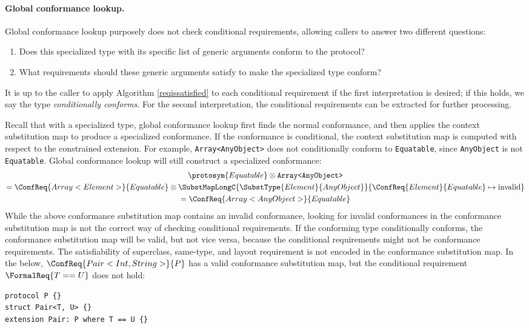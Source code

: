 \documentclass[../generics]{subfiles}
\begin{document}
\paragraph{Global conformance lookup.}
Global conformance lookup purposely does not check conditional requirements, allowing callers to answer two different questions:
\begin{enumerate}
\item Does this specialized type with its specific list of generic arguments conform to the protocol?
\item What requirements should these generic arguments satisfy to make the specialized type conform?
\end{enumerate}
It is up to the caller to apply Algorithm \ref{reqissatisfied} to each conditional requirement if the first interpretation is desired; if this holds, we say the type \emph{conditionally conforms}. For the second interpretation, the conditional requirements can be extracted for further processing.

Recall that with a specialized type, global conformance lookup first finds the normal conformance, and then applies the context substitution map to produce a specialized conformance. If the conformance is conditional, the context substitution map is computed with respect to the constrained extension. For example, \texttt{Array<AnyObject>} does not conditionally conform to \texttt{Equatable}, since \texttt{AnyObject} is not \texttt{Equatable}. Global conformance lookup will still construct a specialized conformance:
\begin{gather*}
\protosym{Equatable} \otimes \texttt{Array<AnyObject>}\\
= \ConfReq{Array<Element>}{Equatable} \otimes \SubstMapLongC{\SubstType{Element}{AnyObject}}{\ConfReq{Element}{Equatable}\mapsto\text{invalid}}\\
= \ConfReq{Array<AnyObject>}{Equatable}
\end{gather*}
While the above conformance substitution map contains an invalid conformance, looking for invalid conformances in the conformance substitution map is not the correct way of checking conditional requirements. If the conforming type conditionally conforms, the conformance substitution map will be valid, but not vice versa, because the conditional requirements might not be conformance requirements. The satisfiability of superclass, same-type, and layout requirement is not encoded in the conformance substitution map. In the below, $\ConfReq{Pair<Int, String>}{P}$ has a valid conformance substitution map, but the conditional requirement $\FormalReq{T == U}$ does not hold:
\begin{Verbatim}
protocol P {}
struct Pair<T, U> {}
extension Pair: P where T == U {}
\end{Verbatim}
\end{document}
